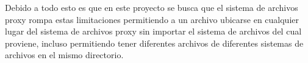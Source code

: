 Debido a todo esto es que en este proyecto se busca que el sistema de archivos proxy rompa estas limitaciones permitiendo a un archivo ubicarse en cualquier lugar del sistema de archivos proxy sin importar el sistema de archivos del cual proviene, incluso permitiendo tener diferentes archivos de diferentes sistemas de archivos en el mismo directorio.




